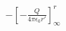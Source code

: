 \documentclass[preview]{standalone}
\begin{document}
\begin{align*}
-\left[-\frac{Q}{4\pi \epsilon_0 r'}\right]_{\infty}^{r}
\end{align*}
\end{document}
